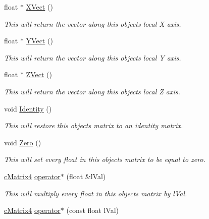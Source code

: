\begin{DoxyCompactItemize}
float $\ast$ \hyperlink{classc_matrix4_a958689f28a118eac91104f5a847ac0fd}{XVect} ()
\begin{DoxyCompactList}\small\item\em This will return the vector along this objects local X axis. \item\end{DoxyCompactList}\item 
float $\ast$ \hyperlink{classc_matrix4_acff0242ac76b2ccd854eeec0d4913abe}{YVect} ()
\begin{DoxyCompactList}\small\item\em This will return the vector along this objects local Y axis. \item\end{DoxyCompactList}\item 
float $\ast$ \hyperlink{classc_matrix4_ab3d5e1a9ca6652c84265d4d164494699}{ZVect} ()
\begin{DoxyCompactList}\small\item\em This will return the vector along this objects local Z axis. \item\end{DoxyCompactList}\item 
void \hyperlink{classc_matrix4_a6aa4f58a001499cd666f9d65f3a821a0}{Identity} ()
\begin{DoxyCompactList}\small\item\em This will restore this objects matrix to an identity matrix. \item\end{DoxyCompactList}\item 
void \hyperlink{classc_matrix4_acf16f37d849137d2e410ec20f2b4e74d}{Zero} ()
\begin{DoxyCompactList}\small\item\em This will set every float in this objects matrix to be equal to zero. \item\end{DoxyCompactList}\item 
\hyperlink{classc_matrix4}{cMatrix4} \hyperlink{classc_matrix4_a2370d66d55b851b1e720f7e9cfe751b8}{operator$\ast$} (float \&lVal)
\begin{DoxyCompactList}\small\item\em This will multiply every float in this objects matrix by lVal. \item\end{DoxyCompactList}\item 
\hyperlink{classc_matrix4}{cMatrix4} \hyperlink{classc_matrix4_ad615ac415cde0d33c39928cf94573903}{operator$\ast$} (const float lVal)

\end{DoxyCompactItemize}
